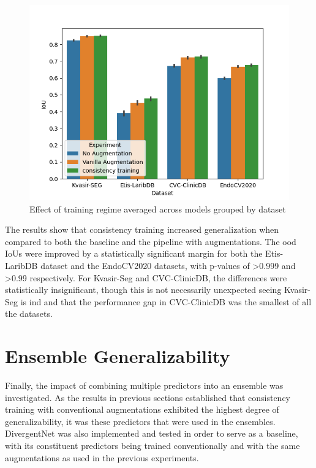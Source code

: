 \begin{figure}
    \centering
    \includegraphics[width=\linewidth]{illustrations/consistency_training_reduced_along_models.png}
    \caption{Effect of training regime averaged across models grouped by dataset}
    \label{fig:consistency_training}
\end{figure}
The results show that consistency training increased generalization when compared to both the baseline and the pipeline with augmentations. The \gls{ood} IoUs were improved by a statistically significant margin for both the Etis-LaribDB dataset and the EndoCV2020 datasets, with p-values of >0.999 and >0.99 respectively. For Kvasir-Seg and CVC-ClinicDB, the differences were statistically insignificant, though this is not necessarily unexpected seeing Kvasir-Seg is \gls{ind} and that the performance gap in CVC-ClinicDB was the smallest of all the datasets. 



\section{Ensemble Generalizability}\label{ensembles}
Finally, the impact of combining multiple predictors into an ensemble was investigated. As the results in previous sections established that consistency training with conventional augmentations exhibited the highest degree of generalizability, it was these predictors that were used in the ensembles. DivergentNet \cite{divergentnets} was also implemented and tested in order to serve as a baseline, with its constituent predictors being trained conventionally and with the same augmentations as used in the previous experiments. 

